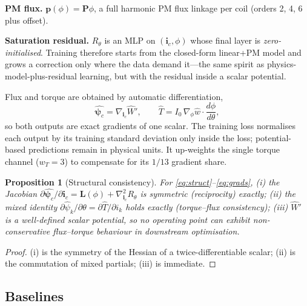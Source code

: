 \documentclass[review]{elsarticle}
\newtheorem{proposition}{Proposition}
\newcommand{\ic}{\boldsymbol{i}_c}
\newcommand{\psic}{\boldsymbol{\psi}_c}
\begin{document}
\textbf{PM flux.} $\boldsymbol{p}(\phi)=\mathbf{P}\phi$, a full harmonic PM
flux linkage per coil (orders 2, 4, 6 plus offset).

\textbf{Saturation residual.} $R_\theta$ is an MLP on $(\ic,\phi)$ whose
final layer is \emph{zero-initialised}. Training therefore starts from the
closed-form linear+PM model and grows a correction only where the data demand
it---the same spirit as physics-model-plus-residual learning, but with the
residual inside a scalar potential.

Flux and torque are obtained by automatic differentiation,
\begin{equation}
\hat{\psic}=\nabla_{\ic}\hat{W}',\qquad
\hat{T}=I_0\,\nabla_{\phi}\hat{w}\cdot\frac{d\phi}{d\theta},
\label{eq:grads}
\end{equation}
so both outputs are exact gradients of one scalar. The training loss
normalises each output by its training standard deviation only inside the
loss; potential-based predictions remain in physical units. It up-weights
the single torque channel ($w_T=3$) to compensate for its $1/13$ gradient
share.

\begin{proposition}[Structural consistency]
\label{prop:consistency}
For \eqref{eq:struct}--\eqref{eq:grads}, (i) the Jacobian
$\partial\hat{\psic}/\partial\ic=\mathbf{L}(\phi)+\nabla^2_{\ic}R_\theta$ is
symmetric (reciprocity) exactly; (ii) the mixed identity
$\partial\hat{\psi}_k/\partial\theta=\partial\hat{T}/\partial i_k$ holds
exactly (torque--flux consistency); (iii) $\hat{W}'$ is a well-defined scalar
potential, so no operating point can exhibit non-conservative flux--torque
behaviour in downstream optimisation.
\end{proposition}

\begin{proof}
(i) is the symmetry of the Hessian of a twice-differentiable scalar; (ii)
is the commutation of mixed partials; (iii) is immediate.
\end{proof}

\subsection{Baselines}
\end{document}
